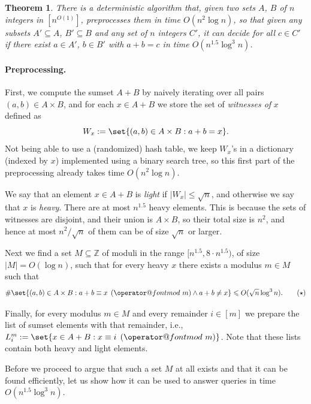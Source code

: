 \documentclass[10pt,a4paper]{article}
\makeatletter
\newtheorem{theorem}{Theorem}[section]
\newcommand{\tpmod}[1]{\mkern 8mu({\operator@font mod}\mkern 6mu#1)}
\makeatother
\begin{document}
\begin{theorem}\label{thm:unknowncdet}
    There is a deterministic algorithm that, given two sets $A$, $B$ of $n$ integers in $[n^{O(1)}]$, preprocesses them in time $O(n^2 \log n)$, so that given any subsets $A' \subseteq A$, $B' \subseteq B$ and any set of $n$ integers $C'$, it can decide for all $c \in C'$ if there exist $a \in A'$, $b \in B'$ with $a+b=c$ in time $O(n^{1.5} \log^3 n)$.
\end{theorem}


\paragraph{Preprocessing.}

First, we compute the sumset $A+B$ by naively iterating over all pairs $(a,b) \in A \times B$, and for each $x \in A+B$ we store the set of \emph{witnesses of} $x$ defined as
\[W_x := \set{ (a, b) \in A \times B : a + b = x}.\]
Not being able to use a (randomized) hash table, we keep $W_x$'s in a dictionary (indexed by $x$) implemented using a binary search tree, so this first part of the preprocessing already takes time $O(n^2 \log n)$.

We say that an element $x \in A+B$ is \emph{light} if $|W_x| \leqslant \sqrt{n}$, and otherwise we say that $x$ is \emph{heavy}. There are at most $n^{1.5}$ heavy elements.
This is because the sets of witnesses are disjoint, and their union is $A \times B$, so their total size is $n^2$, and hence at most $n^2/\sqrt{n}$ of them can be of size $\sqrt{n}$ or larger.

Next we find a set $M \subseteq \mathbb{Z}$ of moduli in the range $[n^{1.5}, 8 \cdot n^{1.5})$, of size $|M|=O(\log n)$, such that for every heavy $x$ there exists a modulus $m \in M$ such that
\[\#\set{(a,b) \in A \times B : a + b \equiv x \tpmod{m} \land a+b \neq x} \leqslant O(\sqrt{n} \log^3 n). \tag{$\star$}\]

Finally, for every modulus $m \in M$ and every remainder $i \in [m]$ we prepare the list of sumset elements with that remainder, i.e., $L^m_i := \set{x \in A+B : x \equiv i \tpmod{m}}$. Note that these lists contain both heavy and light elements.

Before we proceed to argue that such a set $M$ at all exists and that it can be found efficiently, let us show how it can be used to answer queries in time $O(n^{1.5} \log^3 n)$.
\end{document}
